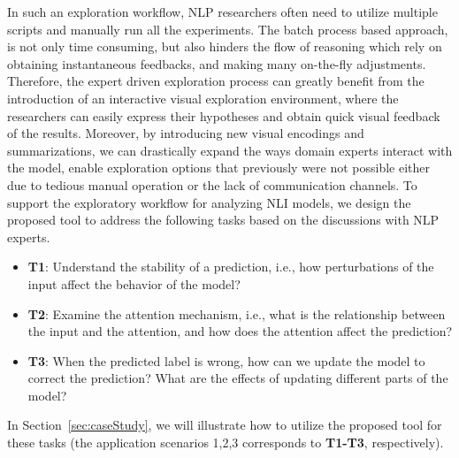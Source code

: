 In such an exploration workflow, NLP researchers often need to utilize multiple scripts and manually run all the experiments. The batch process based approach, is not only time consuming, but also hinders the flow of reasoning which rely on obtaining instantaneous feedbacks, and making many on-the-fly adjustments.
%
Therefore, the expert driven exploration process can greatly benefit from the introduction of an interactive visual exploration environment, where the researchers can easily express their hypotheses and obtain quick visual feedback of the results.
%
Moreover, by introducing new visual encodings and summarizations, we can drastically expand the ways domain experts interact with the model, enable exploration options that previously were not possible either due to tedious manual operation or the lack of communication channels.
%
To support the exploratory workflow for analyzing NLI models,
we design the proposed tool to address the following tasks based on the discussions with NLP experts.

\vspace {-2mm}
\begin{itemize}
\item \textbf{T1}: Understand the stability of a prediction, i.e., how perturbations of the input affect the behavior of the model?
    
\item \textbf{T2}: Examine the attention mechanism, i.e., what is the relationship between the input and the attention, and how does the attention affect the prediction?
    
\item \textbf{T3}: When the predicted label is wrong, how can we update the model to correct the prediction? What are the effects of updating different parts of the model?
\end{itemize}
\vspace {-2mm}

In Section~\ref{sec:caseStudy}, we will illustrate how to utilize the proposed tool for these tasks (the application scenarios 1,2,3 corresponds to \textbf{T1-T3}, respectively).



